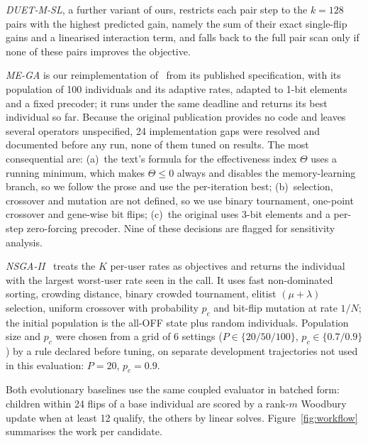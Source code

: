 \documentclass[runningheads]{llncs}
\newcommand{\bts}{\mbox{DUET-M}}
\begin{document}
\emph{\bts{}-SL}, a further variant of ours, restricts each pair step to the $k=128$ pairs with the highest predicted gain, namely the sum of their exact single-flip gains and a linearised interaction term, and falls back to the full pair scan only if none of these pairs improves the objective.

\emph{ME-GA} is our reimplementation of~\cite{zardi2024memory} from its published specification, with its population of 100 individuals and its adaptive rates, adapted to 1-bit elements and a fixed precoder; it runs under the same deadline and returns its best individual so far. Because the original publication provides no code and leaves several operators unspecified, 24 implementation gaps were resolved and documented before any run, none of them tuned on results. The most consequential are: (a)~the text's formula for the effectiveness index $\Theta$ uses a running minimum, which makes $\Theta\le0$ always and disables the memory-learning branch, so we follow the prose and use the per-iteration best; (b)~selection, crossover and mutation are not defined, so we use binary tournament, one-point crossover and gene-wise bit flips; (c)~the original uses 3-bit elements and a per-step zero-forcing precoder. Nine of these decisions are flagged for sensitivity analysis.

\emph{NSGA-II}~\cite{deb2002fast} treats the $K$ per-user rates as objectives and returns the individual with the largest worst-user rate seen in the call. It uses fast non-dominated sorting, crowding distance, binary crowded tournament, elitist $(\mu+\lambda)$ selection, uniform crossover with probability $p_c$ and bit-flip mutation at rate $1/N$; the initial population is the all-OFF state plus random individuals. Population size and $p_c$ were chosen from a grid of 6 settings ($P\in\{20/50/100\}$, $p_c\in\{0.7/0.9\}$) by a rule declared before tuning, on separate development trajectories not used in this evaluation: $P=20$, $p_c=0.9$.

Both evolutionary baselines use the same coupled evaluator in batched form: children within 24 flips of a base individual are scored by a rank-$m$ Woodbury update when at least 12 qualify, the others by linear solves. Figure~\ref{fig:workflow} summarises the work per candidate.
\end{document}
